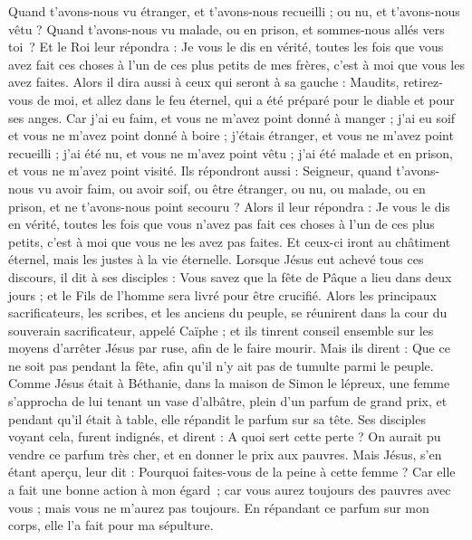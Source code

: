 \begin{multicols}{2}
{Quand t'avons-nous vu étranger, et t'avons-nous recueilli ; ou nu, et t'avons-nous vêtu ?
Quand t'avons-nous vu malade, ou en prison, et sommes-nous allés vers toi ?
Et le Roi leur répondra : Je vous le dis en vérité, toutes les fois que vous avez fait ces choses à l'un de ces plus petits de mes frères, c’est à moi que vous les avez faites.
Alors il dira aussi à ceux qui seront à sa gauche : Maudits, retirez-vous de moi, et allez dans le feu éternel, qui a été préparé pour le diable et pour ses anges.
Car j'ai eu faim, et vous ne m'avez point donné à manger ; j'ai eu soif et vous ne m'avez point donné à boire ;
j'étais étranger, et vous ne m'avez point recueilli ; j'ai été nu, et vous ne m'avez point vêtu ; j'ai été malade et en prison, et vous ne m'avez point visité.
Ils répondront aussi : Seigneur, quand t’avons-nous vu avoir faim, ou avoir soif, ou être étranger, ou nu, ou malade, ou en prison, et ne t'avons-nous point secouru ?
Alors il leur répondra : Je vous le dis en vérité, toutes les fois que vous n'avez pas fait ces choses à l'un de ces plus petits, c’est à moi que vous ne les avez pas faites.
Et ceux-ci iront au châtiment éternel, mais les justes à la vie éternelle.
\VerseOne{}Lorsque Jésus eut achevé tous ces discours, il dit à ses disciples :
Vous savez que la fête de Pâque a lieu dans deux jours ; et le Fils de l'homme sera livré pour être crucifié.
Alors les principaux sacrificateurs, les scribes, et les anciens du peuple, se réunirent dans la cour du souverain sacrificateur, appelé Caïphe ;
et ils tinrent conseil ensemble sur les moyens d’arrêter Jésus par ruse, afin de le faire mourir.
Mais ils dirent : Que ce ne soit pas pendant la fête, afin qu’il n’y ait pas de tumulte parmi le peuple.
Comme Jésus était à Béthanie, dans la maison de Simon le lépreux,
une femme s’approcha de lui tenant un vase d'albâtre, plein d'un parfum de grand prix, et pendant qu’il était à table, elle répandit le parfum sur sa tête.
Ses disciples voyant cela, furent indignés, et dirent : A quoi sert cette perte ?
On aurait pu vendre ce parfum très cher, et en donner le prix aux pauvres.
Mais Jésus, s’en étant aperçu, leur dit : Pourquoi faites-vous de la peine à cette femme ? Car elle a fait une bonne action à mon égard ;
car vous aurez toujours des pauvres avec vous ; mais vous ne m'aurez pas toujours.
En répandant ce parfum sur mon corps, elle l'a fait pour ma sépulture.
}
\end{multicols}
